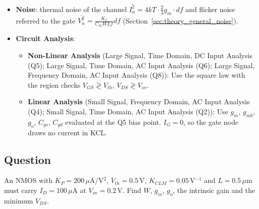 \begin{itemize}
\begin{itemize}
        body effect coefficient \(K_B\) (V\(^{1/2}\)) and Fermi potential \(V_F\):
        \[
          V_{th} = V_{th0} + K_B \left( \sqrt{2V_F + V_{SB}} - \sqrt{2V_F} \right)
        \]
      \item \textbf{Subthreshold Conduction} (\(V_{GS} \lesssim V_{th}\)): diffusion
            current, exponential like a BJT, with slope factor \(n \approx 1.2\text{--}1.5\):
            \[
              I_D = I_{D0} \frac{W}{L} e^{\frac{V_{GS} - V_{th}}{n V_T}} \left(1 - e^{-\frac{V_{DS}}{V_T}}\right)
            \]
    \end{itemize}
  \item \textbf{Noise}: thermal noise of the channel
    \(\overline{I_n^2} = 4kT \cdot \frac{2}{3} g_m \cdot df\) and flicker noise
    referred to the gate \(\overline{V_n^2} = \frac{K_f}{C_{ox} W L f} df\)
    (Section~\ref{sec:theory_general_noise}).
  \item \textbf{Circuit Analysis}:
    \begin{itemize}
      \item \textbf{Non-Linear Analysis} (Large Signal, Time Domain, DC
        Input Analysis (Q5); Large Signal, Time Domain, AC Input Analysis
        (Q6); Large Signal, Frequency Domain, AC Input Analysis (Q8)): Use the square law
        with the region checks \(V_{GS} \gtrless V_{th}\), \(V_{DS} \gtrless V_{ov}\).
      \item \textbf{Linear Analysis} (Small Signal, Frequency Domain, AC
        Input Analysis (Q4); Small Signal, Time Domain, AC Input Analysis
        (Q2)): Use \(g_m\), \(g_{mb}\), \(g_o\),
        \(C_{gs}\), \(C_{gd}\) evaluated at the Q5 bias point. \(I_G = 0\),
        so the gate node draws no current in KCL.
    \end{itemize}
\end{itemize}

\subsection{Question}
An NMOS with \(K_P = 200\,\mu\)A/V\(^2\), \(V_{th} = 0.5\,\)V,
\(K_{CLM} = 0.05\,\)V\(^{-1}\) and \(L = 0.5\,\mu\)m must carry
\(I_D = 100\,\mu\)A at \(V_{ov} = 0.2\,\)V. Find \(W\), \(g_m\), \(g_o\), the
intrinsic gain and the minimum \(V_{DS}\).
